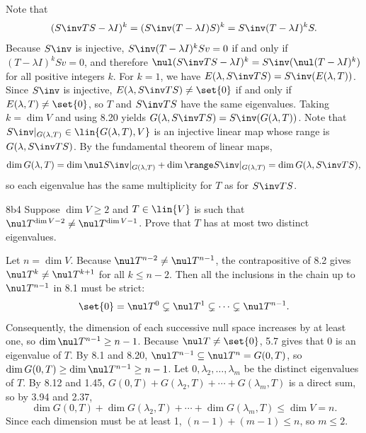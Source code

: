 \begin{sol}
    Note that
    \[
        (S\inv TS - \lambda I)^k = (S\inv (T - \lambda I) S)^k = S\inv (T - \lambda I)^k S.
    \]
    Because $S\inv$ is injective, $S\inv(T - \lambda I)^kSv = 0$ if and only if $(T - \lambda I)^kSv = 0$, and therefore $\nul(S\inv TS - \lambda I)^k = S\inv(\nul(T - \lambda I)^k)$ for all positive integers $k$.
    For $k=1$, we have $E(\lambda, S\inv TS) = S\inv(E(\lambda, T))$.
    Since $S\inv$ is injective, $E(\lambda, S\inv TS) \neq \set{0}$ if and only if $E(\lambda, T) \neq \set{0}$, so $T$ and $S\inv TS$ have the same eigenvalues.
    Taking $k=\dim V$ and using 8.20 yields $G(\lambda, S\inv TS) = S\inv(G(\lambda, T))$.
    Note that $S\inv|_{G(\lambda, T)} \in \lin{G(\lambda, T), V}$ is an injective linear map whose range is $G(\lambda, S\inv TS)$.
    By the fundamental theorem of linear maps,
    \[
        \dim G(\lambda, T) = \dim \nul S\inv|_{G(\lambda, T)} + \dim \range S\inv|_{G(\lambda, T)} = \dim G(\lambda, S\inv TS),
    \]
    so each eigenvalue has the same multiplicity for $T$ as for $S\inv TS$.
\end{sol}

\begin{exercise}{8b4}
    Suppose $\dim V \geq 2$ and $T \in \lin{V}$ is such that $\nul T^{\dim V - 2} \neq \nul T^{\dim V - 1}$.
    Prove that $T$ has at most two distinct eigenvalues.
\end{exercise}

\begin{sol}
    Let $n = \dim V$.
    Because $\nul T^{n-2} \neq \nul T^{n-1}$, the contrapositive of 8.2 gives $\nul T^k \neq \nul T^{k+1}$ for all $k \leq n-2$.
    Then all the inclusions in the chain up to $\nul T^{n-1}$ in 8.1 must be strict:
    \[
        \set{0} = \nul T^0 \subsetneq \nul T^1 \subsetneq \cdots \subsetneq \nul T^{n-1}.
    \]
    Consequently, the dimension of each successive null space increases by at least one, so $\dim \nul T^{n-1} \geq n-1$.
    Because $\nul T \neq \set{0}$, 5.7 gives that $0$ is an eigenvalue of $T$.
    By 8.1 and 8.20, $\nul T^{n-1} \subseteq \nul T^n = G(0, T)$, so $\dim G(0, T) \geq \dim \nul T^{n-1} \geq n-1$.
    Let $0, \lambda_2, \ldots, \lambda_m$ be the distinct eigenvalues of $T$.
    By 8.12 and 1.45, $G(0, T) + G(\lambda_2, T) + \cdots + G(\lambda_m, T)$ is a direct sum, so by 3.94 and 2.37,
    \[
        \dim G(0, T) + \dim G(\lambda_2, T) + \cdots + \dim G(\lambda_m, T) \leq \dim V = n.
    \]
    Since each dimension must be at least 1, $(n-1) + (m-1) \leq n$, so $m \leq 2$.
\end{sol}

